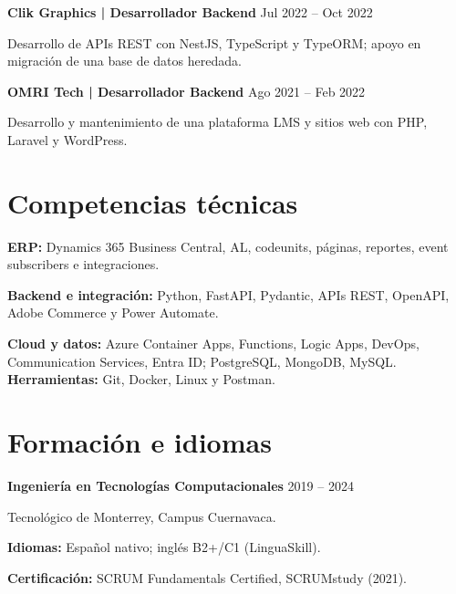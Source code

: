 \documentclass[10pt,letterpaper]{article}
\begin{document}
\vspace{3pt}
\textbf{Clik Graphics | Desarrollador Backend} \hfill Jul 2022 -- Oct 2022\par
Desarrollo de APIs REST con NestJS, TypeScript y TypeORM; apoyo en migración de una base de datos heredada.

\vspace{3pt}
\textbf{OMRI Tech | Desarrollador Backend} \hfill Ago 2021 -- Feb 2022\par
Desarrollo y mantenimiento de una plataforma LMS y sitios web con PHP, Laravel y WordPress.

\section{Competencias técnicas}
\textbf{ERP:} Dynamics 365 Business Central, AL, codeunits, páginas, reportes, event subscribers e integraciones.\par
\textbf{Backend e integración:} Python, FastAPI, Pydantic, APIs REST, OpenAPI, Adobe Commerce y Power Automate.\par
\textbf{Cloud y datos:} Azure Container Apps, Functions, Logic Apps, DevOps, Communication Services, Entra ID; PostgreSQL, MongoDB, MySQL. \textbf{Herramientas:} Git, Docker, Linux y Postman.

\section{Formación e idiomas}
\textbf{Ingeniería en Tecnologías Computacionales} \hfill 2019 -- 2024\par
Tecnológico de Monterrey, Campus Cuernavaca.\par
\textbf{Idiomas:} Español nativo; inglés B2+/C1 (LinguaSkill).\par
\textbf{Certificación:} SCRUM Fundamentals Certified, SCRUMstudy (2021).
\end{document}
